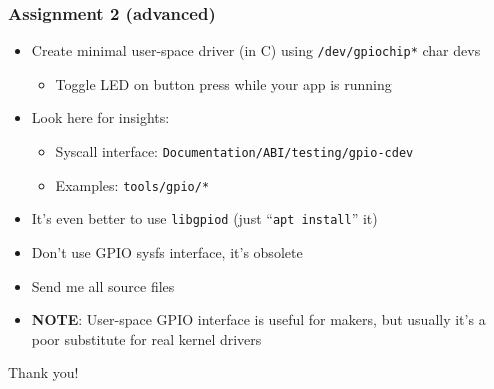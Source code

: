 \documentclass[aspectratio=169,usenames,dvipsnames]{beamer}
\begin{document}
\begin{frame}
  \frametitle{Assignment 2 (advanced)}
  \begin{itemize}
    \item Create minimal user-space driver (in C) using
          \texttt{/dev/gpiochip*} char devs
      \begin{itemize}
        \item Toggle LED on button press while your app is running
      \end{itemize}
    \item Look here for insights:
      \begin{itemize}
        \item Syscall interface: \texttt{Documentation/ABI/testing/gpio-cdev}
        \item Examples: \texttt{tools/gpio/*}
      \end{itemize}
    \item It's even better to use \texttt{libgpiod} (just
          ``\texttt{apt install}'' it)
    \item Don't use GPIO sysfs interface, it's obsolete
    \item Send me all source files
    \item \textbf{NOTE}: User-space GPIO interface is useful for makers, but
          usually it's a poor substitute for real kernel drivers
  \end{itemize}
\end{frame}

\begin{frame}[standout]
  Thank you!
\end{frame}
\end{document}
